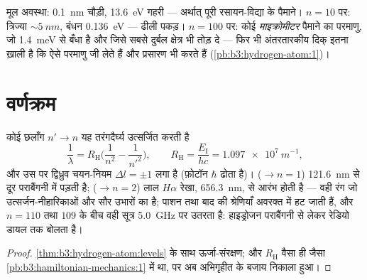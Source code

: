 \begin{example}[आकार पढ़ना]\label{ex:b3:hydrogen-atom:sizes}
मूल अवस्था: \qty{0.1}{nm} चौड़ी, \qty{13.6}{eV} गहरी --- अर्थात्
पूरी रसायन-विद्या के पैमाने। $n = 10$ पर: त्रिज्या $\sim\qty{5}{nm}$,
बंधन \qty{0.136}{eV} --- ढीली पकड़। $n = 100$ पर: कोई
\emph{माइक्रोमीटर} पैमाने का परमाणु, जो \qty{1.4}{meV} से बँधा है और
जिसे सबसे दुर्बल क्षेत्र भी तोड़ दे --- फिर भी अंतरतारकीय दिक् इतना
ख़ाली है कि ऐसे परमाणु जी लेते हैं और प्रसारण भी करते हैं
(\cref{pb:b3:hydrogen-atom:1})।
\end{example}

\section{वर्णक्रम}

\begin{proposition}[श्रेणियाँ और चयन-नियम]\label{prop:b3:hydrogen-atom:series}
कोई छलाँग $n' \to n$ यह तरंगदैर्घ्य उत्सर्जित करती है
\[
\frac{1}{\lambda} = R_{\text{H}}\Big(\frac{1}{n^2} -
\frac{1}{n'^2}\Big) , \qquad
R_{\text{H}} = \frac{E_{\text{I}}}{hc} = \qty{1.097e7}{m^{-1}} ,
\]
और उस पर द्विध्रुव चयन-नियम $\Delta l = \pm1$ लगा है (फ़ोटॉन
$\hbar$ ढोता है)।  ($\to n = 1$) \qty{121.6}{nm} से
दूर पराबैंगनी में पड़ती है;  ($\to n = 2$)
लाल $H\alpha$ रेखा, \qty{656.3}{nm}, से आरंभ होती है --- वही रंग जो
उत्सर्जन-नीहारिकाओं और सौर उभारों का है; पाशन तथा बाद की श्रेणियाँ
अवरक्त में हट जाती हैं, और $n = 110$ तथा $109$ के बीच वही
सूत्र \qty{5.0}{GHz} पर उतरता है: हाइड्रोजन
पराबैंगनी से लेकर रेडियो डायल तक बोलता है।
\end{proposition}

\begin{proof}
\cref{thm:b3:hydrogen-atom:levels} के साथ ऊर्जा-संरक्षण;
और $R_{\text{H}}$ वैसा ही जैसा \cref{pb:b3:hamiltonian-mechanics:1} में था, पर
अब अभिगृहीत के बजाय निकाला हुआ।
\end{proof}

